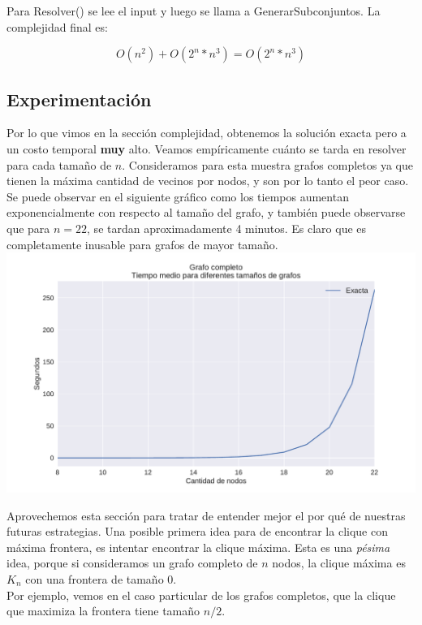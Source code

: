 Para Resolver() se lee el input y luego se llama a GenerarSubconjuntos. La complejidad final es:

$$ O(n^2) + O(2^{n} * n^{3}) = O(2^{n} * n^{3})$$

\subsection{Experimentación}

Por lo que vimos en la sección complejidad, obtenemos la solución exacta pero a un costo temporal \textbf{muy} alto. Veamos empíricamente cuánto se tarda en resolver para cada tamaño de $n$. Consideramos para esta muestra grafos completos ya que tienen la máxima cantidad de vecinos por nodos, y son por lo tanto el peor caso. \\

Se puede observar en el siguiente gráfico como los tiempos aumentan exponencialmente con respecto al tamaño del grafo, y también puede observarse que para $n = 22$, se tardan aproximadamente 4 minutos. Es claro que es completamente inusable para grafos de mayor tamaño. \\

{\centering
    \includegraphics[width=1\textwidth]{informe/imgs/exp_completo_tiempo_exacta.pdf} \\
}

Aprovechemos esta sección para tratar de entender mejor el por qué de nuestras futuras estrategias. Una posible primera idea para de encontrar la clique con máxima frontera, es intentar encontrar la clique máxima. Esta es una \textit{pésima} idea, porque si consideramos un grafo completo de $n$ nodos, la clique máxima es $K_n$ con una frontera de tamaño 0. \\

Por ejemplo, vemos en el caso particular de los grafos completos, que la clique que maximiza la frontera tiene tamaño $n/2$.

